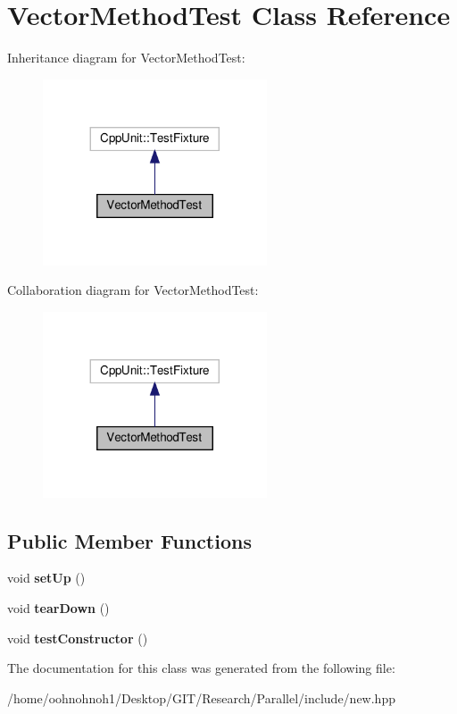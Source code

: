 \hypertarget{classVectorMethodTest}{}\section{Vector\+Method\+Test Class Reference}
\label{classVectorMethodTest}


Inheritance diagram for Vector\+Method\+Test\+:
\nopagebreak
\begin{figure}[H]
\begin{center}
\leavevmode
\includegraphics[width=188pt]{classVectorMethodTest__inherit__graph}
\end{center}
\end{figure}


Collaboration diagram for Vector\+Method\+Test\+:
\nopagebreak
\begin{figure}[H]
\begin{center}
\leavevmode
\includegraphics[width=188pt]{classVectorMethodTest__coll__graph}
\end{center}
\end{figure}
\subsection*{Public Member Functions}
\begin{DoxyCompactItemize}
\item 
\mbox{\label{classVectorMethodTest_a4ca09c1329683bb368b6bd28df840f23}} 
void {\bfseries set\+Up} ()
\item 
\mbox{\label{classVectorMethodTest_a9a758704660f646ed8dfbc913dcb69f7}} 
void {\bfseries tear\+Down} ()
\item 
\mbox{\label{classVectorMethodTest_aa81901684a9d920f34ebadfd0616c783}} 
void {\bfseries test\+Constructor} ()
\end{DoxyCompactItemize}


The documentation for this class was generated from the following file\+:\begin{DoxyCompactItemize}
\item 
/home/oohnohnoh1/\+Desktop/\+G\+I\+T/\+Research/\+Parallel/include/new.\+hpp\end{DoxyCompactItemize}
